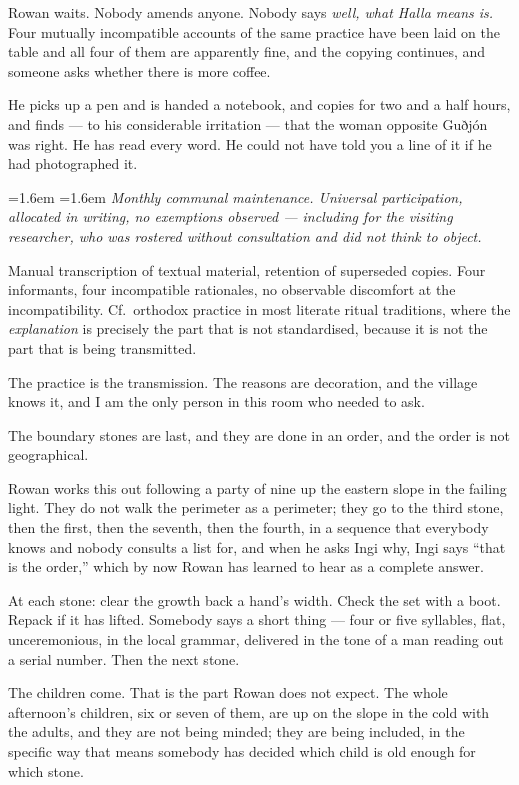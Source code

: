\documentclass[11pt,oneside]{book}
\newcommand{\sceneline}{%
  \par\vspace{1.2em}
  \begin{center}
    \fontsize{11}{11}\selectfont \textbullet\quad\textbullet\quad\textbullet
  \end{center}
  \vspace{0.6em}\noindent\ignorespaces
}
\newenvironment{fieldnote}
  {\par\vspace{0.9em}\begingroup
   \leftskip=1.6em \rightskip=1.6em
   \fontsize{10}{12.4}\selectfont\itshape
   \setlength{\parindent}{0pt}\noindent\ignorespaces}
  {\par\endgroup\vspace{0.9em}\noindent\ignorespaces}
\begin{document}
Rowan waits. Nobody amends anyone. Nobody says \emph{well, what Halla
means is.} Four mutually incompatible accounts of the same practice have
been laid on the table and all four of them are apparently fine, and the
copying continues, and someone asks whether there is more coffee.

He picks up a pen and is handed a notebook, and copies for two and a
half hours, and finds --- to his considerable irritation --- that the
woman opposite Guðjón was right. He has read every word. He could not
have told you a line of it if he had photographed it.

\begin{fieldnote}
Monthly communal maintenance. Universal participation, allocated in
writing, no exemptions observed --- including for the visiting
researcher, who was rostered without consultation and did not think to
object.

Manual transcription of textual material, retention of superseded
copies. Four informants, four incompatible rationales, no observable
discomfort at the incompatibility. Cf.\ orthodox practice in most
literate ritual traditions, where the \emph{explanation} is precisely the
part that is not standardised, because it is not the part that is being
transmitted.

The practice is the transmission. The reasons are decoration, and the
village knows it, and I am the only person in this room who needed to
ask.
\end{fieldnote}

\sceneline

The boundary stones are last, and they are done in an order, and the
order is not geographical.

Rowan works this out following a party of nine up the eastern slope in
the failing light. They do not walk the perimeter as a perimeter; they
go to the third stone, then the first, then the seventh, then the
fourth, in a sequence that everybody knows and nobody consults a list
for, and when he asks Ingi why, Ingi says ``that is the order,'' which
by now Rowan has learned to hear as a complete answer.

At each stone: clear the growth back a hand's width. Check the set with
a boot. Repack if it has lifted. Somebody says a short thing --- four or
five syllables, flat, unceremonious, in the local grammar, delivered in
the tone of a man reading out a serial number. Then the next stone.

The children come. That is the part Rowan does not expect. The whole
afternoon's children, six or seven of them, are up on the slope in the
cold with the adults, and they are not being minded; they are being
included, in the specific way that means somebody has decided which
child is old enough for which stone.
\end{document}
